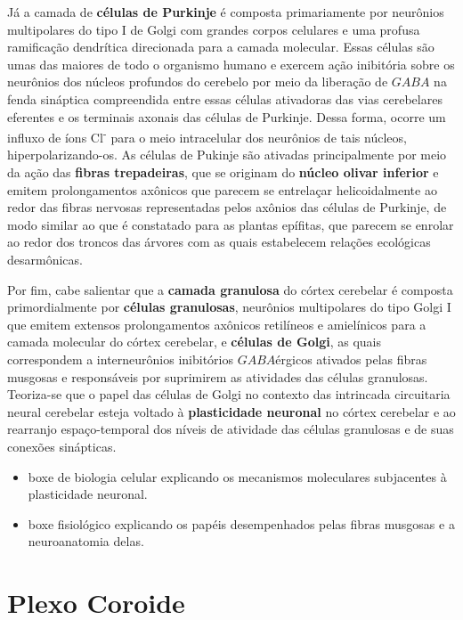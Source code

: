 \documentclass[
]{book}
\theoremstyle{definition}
\theoremstyle{definition}
\theoremstyle{definition}
\theoremstyle{definition}
\theoremstyle{remark}
\begin{document}
Já a camada de \textbf{células de Purkinje} é composta primariamente por neurônios multipolares do tipo I de Golgi com grandes corpos celulares e uma profusa ramificação dendrítica direcionada para a camada molecular. Essas células são umas das maiores de todo o organismo humano e exercem ação inibitória sobre os neurônios dos núcleos profundos do cerebelo por meio da liberação de \(GABA\) na fenda sináptica compreendida entre essas células ativadoras das vias cerebelares eferentes e os terminais axonais das células de Purkinje. Dessa forma, ocorre um influxo de íons Cl\textsuperscript{-} para o meio intracelular dos neurônios de tais núcleos, hiperpolarizando-os. As células de Pukinje são ativadas principalmente por meio da ação das \textbf{fibras trepadeiras}, que se originam do \textbf{núcleo olivar inferior} e emitem prolongamentos axônicos que parecem se entrelaçar helicoidalmente ao redor das fibras nervosas representadas pelos axônios das células de Purkinje, de modo similar ao que é constatado para as plantas epífitas, que parecem se enrolar ao redor dos troncos das árvores com as quais estabelecem relações ecológicas desarmônicas.

Por fim, cabe salientar que a \textbf{camada granulosa} do córtex cerebelar é composta primordialmente por \textbf{células granulosas}, neurônios multipolares do tipo Golgi I que emitem extensos prolongamentos axônicos retilíneos e amielínicos para a camada molecular do córtex cerebelar, e \textbf{células de Golgi}, as quais correspondem a interneurônios inibitórios \(GABA\)érgicos ativados pelas fibras musgosas e responsáveis por suprimirem as atividades das células granulosas. Teoriza-se que o papel das células de Golgi no contexto das intrincada circuitaria neural cerebelar esteja voltado à \textbf{plasticidade neuronal} no córtex cerebelar e ao rearranjo espaço-temporal dos níveis de atividade das células granulosas e de suas conexões sinápticas.

\begin{itemize}
\item
  boxe de biologia celular explicando os mecanismos moleculares subjacentes à plasticidade neuronal.
\item
  boxe fisiológico explicando os papéis desempenhados pelas fibras musgosas e a neuroanatomia delas.
\end{itemize}

\hypertarget{plexo-coroide}{%
\chapter{Plexo Coroide}\label{plexo-coroide}}
\end{document}
